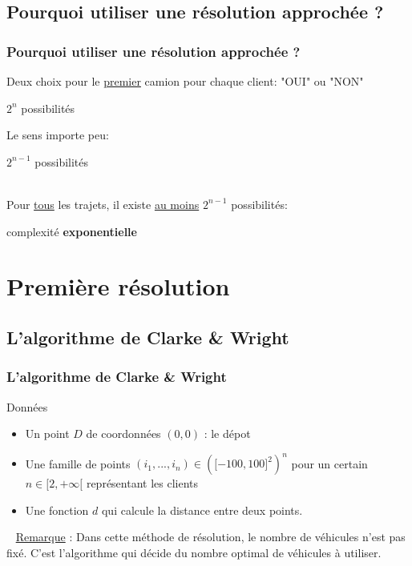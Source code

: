 \documentclass[10pt]{beamer}
\begin{document}
	\subsection{Pourquoi utiliser une résolution approchée ?}

	\begin{frame}
		\frametitle{Pourquoi utiliser une résolution approchée ?}
		Deux choix pour le \underline{premier} camion pour chaque client: "OUI" ou "NON"
		\pause
		\begin{center}
			$2^n$ possibilités
		\end{center}
		\pause
		Le sens importe peu:
		\begin{center}
			$2^{n-1}$ possibilités
		\end{center}
		\pause
		\ \\Pour \underline{tous} les trajets, il existe \underline{au moins} $2^{n-1}$ possibilités: \pause 
		\begin{center}
			complexité \textbf{exponentielle}
		\end{center}
	\end{frame}

	\section{Première résolution}

	\subsection{L'algorithme de Clarke \& Wright}

	\begin{frame}
		\frametitle{L'algorithme de Clarke \& Wright}
		\begin{beamerboxesrounded}[upper=data_up,lower=data_low,shadow=true]{Données}
			\begin{itemize}[label=-]
				\item Un point $D$ de coordonnées $(0,0)$ : le dépot
				\pause
				\item Une famille de points \((i_1,...,i_n) \in {(\lbrack-100,100\rbrack^2)}^n\) pour un certain $n \in \lbrack2,+\infty\lbrack$ représentant les clients
				\pause
				\item Une fonction $d$ qui calcule la distance entre deux points.
				\pause
			\end{itemize}
		\end{beamerboxesrounded}\ \newline
		\underline{Remarque} : Dans cette méthode de résolution, le nombre de véhicules n'est pas fixé. C'est l'algorithme qui décide du nombre optimal de véhicules à utiliser. 
	\end{frame}
	 
\end{document}
